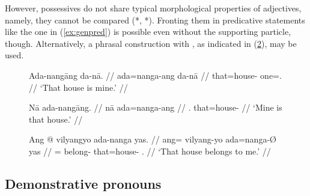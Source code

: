 However, possessives do not share typical morphological properties of
adjectives, namely, they cannot be compared (*,
*). Fronting them in predicative statements like
the one in (\ref{ex:genpred}) is possible even without the supporting particle,
though. Alternatively, a phrasal construction with
, as indicated in (\ref{ex:genphrase}), may be
used.

\begin{figure}[h]
\pex\label{ex:genpred}
\a\label{ex:genpred_1}\begingl
	\gla Ada-nangāng da-nā. //
	\glb ada=nanga-ang da-nā //
	\glc that=house-\Aarg{} one=\Fsg{}.\Gen{} //
	\glft `That house is mine.' //
\endgl

\a\label{ex:genpred_2}\begingl
	\gla Nā ada-nangāng. //
	\glb nā ada=nanga-ang //
	\glc \Fsg{}.\Gen{} that=house-\Aarg{} //
	\glft `Mine is that house.' //
\endgl
\xe
\end{figure}

\begin{figure}[h]
\ex\label{ex:genphrase}%
\begingl
	\gla Ang @ vilyangyo ada-nanga yas. //
	\glb ang= vilyang-yo ada=nanga-Ø yas //
	\glc \AgtT{}= belong-\TsgN{} that=house-\Top{} \Fsg{}.\Parg{} //
	\glft `That house belongs to me.' //
\endgl
\xe
\end{figure}


\subsection{Demonstrative pronouns}
\label{subsec:dempro}

